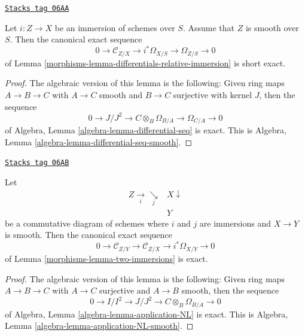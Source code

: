 \begin{lemma}
\label{morphisms-lemma-differentials-relative-immersion-smooth}
\href{https://stacks.math.columbia.edu/tag/06AA}{\texttt{Stacks tag 06AA}}

Let $i : Z \to X$ be an immersion of schemes over $S$.
Assume that $Z$ is smooth over $S$. Then the
canonical exact sequence
$$
0 \to \mathcal{C}_{Z/X} \to i^*\Omega_{X/S} \to \Omega_{Z/S} \to 0
$$
of
Lemma \ref{morphisms-lemma-differentials-relative-immersion}
is short exact.
\end{lemma}

\begin{proof}
The algebraic version of this lemma is the following:
Given ring maps $A \to B \to C$ with $A \to C$ smooth and $B \to C$
surjective with kernel $J$, then the sequence
$$
0 \to J/J^2 \to C \otimes_B \Omega_{B/A} \to \Omega_{C/A} \to 0
$$
of
Algebra, Lemma \ref{algebra-lemma-differential-seq}
is exact. This is
Algebra, Lemma \ref{algebra-lemma-differential-seq-smooth}.
\end{proof}

\begin{lemma}
\label{morphisms-lemma-two-immersions-smooth}
\href{https://stacks.math.columbia.edu/tag/06AB}{\texttt{Stacks tag 06AB}}

Let
$$
\begin{array}{cc}Z \underset{i}{\longrightarrow}\underset{j}{\searrow} & X \downarrow \\  & Y\end{array}
$$
be a commutative diagram of schemes where $i$ and $j$ are immersions
and $X \to Y$ is smooth.
Then the canonical exact sequence
$$
0 \to  \mathcal{C}_{Z/Y} \to \mathcal{C}_{Z/X} \to i^*\Omega_{X/Y} \to 0
$$
of
Lemma \ref{morphisms-lemma-two-immersions}
is exact.
\end{lemma}

\begin{proof}
The algebraic version of this lemma is the following:
Given ring maps $A \to B \to C$ with $A \to C$ surjective and $A \to B$
smooth, then the sequence
$$
0 \to I/I^2 \to J/J^2 \to C \otimes_B \Omega_{B/A} \to 0
$$
of
Algebra, Lemma \ref{algebra-lemma-application-NL}
is exact. This is
Algebra, Lemma \ref{algebra-lemma-application-NL-smooth}.
\end{proof}

